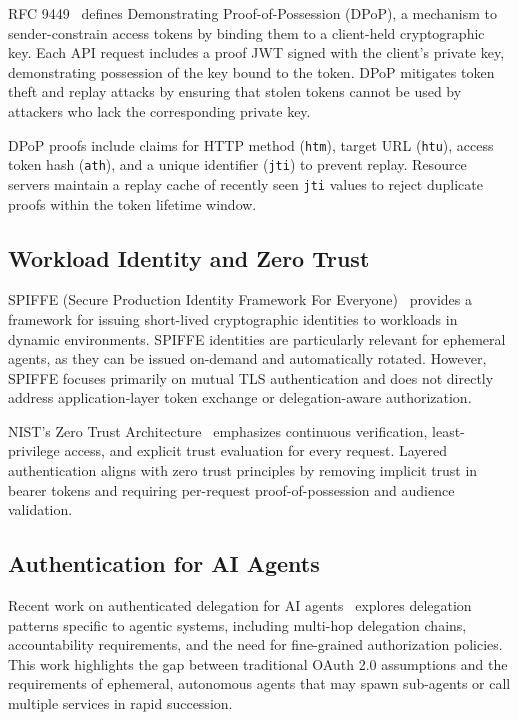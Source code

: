 \documentclass[conference,10pt]{IEEEtran}
\begin{document}
RFC 9449~\cite{rfc9449} defines Demonstrating Proof-of-Possession (DPoP), a mechanism to sender-constrain access tokens by binding them to a client-held cryptographic key. Each API request includes a proof JWT signed with the client's private key, demonstrating possession of the key bound to the token. DPoP mitigates token theft and replay attacks by ensuring that stolen tokens cannot be used by attackers who lack the corresponding private key.

DPoP proofs include claims for HTTP method (\texttt{htm}), target URL (\texttt{htu}), access token hash (\texttt{ath}), and a unique identifier (\texttt{jti}) to prevent replay. Resource servers maintain a replay cache of recently seen \texttt{jti} values to reject duplicate proofs within the token lifetime window.

\subsection{Workload Identity and Zero Trust}

SPIFFE (Secure Production Identity Framework For Everyone)~\cite{spiffe_spec, spiffe_overview} provides a framework for issuing short-lived cryptographic identities to workloads in dynamic environments. SPIFFE identities are particularly relevant for ephemeral agents, as they can be issued on-demand and automatically rotated. However, SPIFFE focuses primarily on mutual TLS authentication and does not directly address application-layer token exchange or delegation-aware authorization.

NIST's Zero Trust Architecture~\cite{nist_zta} emphasizes continuous verification, least-privilege access, and explicit trust evaluation for every request. Layered authentication aligns with zero trust principles by removing implicit trust in bearer tokens and requiring per-request proof-of-possession and audience validation.

\subsection{Authentication for AI Agents}

Recent work on authenticated delegation for AI agents~\cite{authenticated_delegation_agents} explores delegation patterns specific to agentic systems, including multi-hop delegation chains, accountability requirements, and the need for fine-grained authorization policies. This work highlights the gap between traditional OAuth 2.0 assumptions and the requirements of ephemeral, autonomous agents that may spawn sub-agents or call multiple services in rapid succession.
\end{document}
